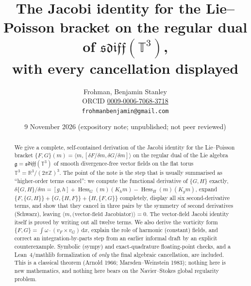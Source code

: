 \documentclass[11pt]{article}
\title{The Jacobi identity for the Lie--Poisson bracket on the regular dual of $\mathfrak{sdiff}(\mathbb{T}^3)$,\\ with every cancellation displayed}
\author{Frohman, Benjamin Stanley\\
ORCID \href{https://orcid.org/0009-0006-7068-3718}{0009-0006-7068-3718}\\
\texttt{frohmanbenjamin@gmail.com}}
\date{9 November 2026 \quad (expository note; unpublished; not peer reviewed)}
\theoremstyle{definition}
\newcommand{\T}{\mathbb{T}^3}
\newcommand{\R}{\mathbb{R}}
\newcommand{\Z}{\mathbb{Z}}
\newcommand{\g}{\mathfrak{g}}
\newcommand{\ip}[2]{\langle #1,#2\rangle}
\newcommand{\dd}{\,\mathrm{d}x}
\newcommand{\Hess}{\operatorname{Hess}}
\begin{document}
\maketitle

\begin{abstract}
We give a complete, self-contained derivation of the Jacobi identity for the Lie--Poisson bracket
$\{F,G\}(m)=\ip{m}{[\delta F/\delta m,\delta G/\delta m]}$ on the regular dual of the Lie algebra
$\g=\mathfrak{sdiff}(\T)$ of smooth divergence-free vector fields on the flat torus
$\T=\R^3/(2\pi\Z)^3$. The point of the note is the step that is usually summarised as
``higher-order terms cancel'': we compute the functional derivative of $\{G,H\}$ exactly,
$\delta\{G,H\}/\delta m=[g,h]+\Hess_G(m)(K_hm)-\Hess_H(m)(K_gm)$, expand
$\{F,\{G,H\}\}+\{G,\{H,F\}\}+\{H,\{F,G\}\}$ completely, display all six second-derivative terms,
and show that they cancel in three pairs by the symmetry of second derivatives (Schwarz), leaving
$\ip{m}{\text{(vector-field Jacobiator)}}=0$. The vector-field Jacobi identity itself is proved by
writing out all twelve terms. We also derive the vorticity form
$\{F,G\}=\int\omega\cdot(v_F\times v_G)\dd$, explain the role of harmonic (constant) fields, and
correct an integration-by-parts step from an earlier informal draft by an explicit counterexample.
Symbolic (sympy) and exact-quadrature floating-point checks, and a Lean~4/mathlib formalization of
\emph{only} the final algebraic cancellation, are included. This is a classical theorem
(Arnold 1966; Marsden--Weinstein 1983); nothing here is new mathematics, and nothing here bears on
the Navier--Stokes global regularity problem.
\end{abstract}

\tableofcontents
\end{document}
